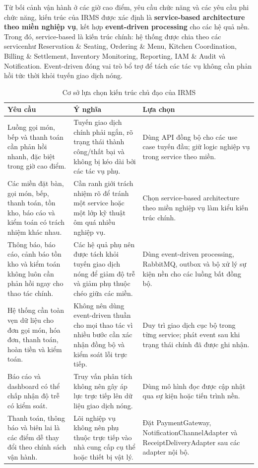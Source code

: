 Từ bối cảnh vận hành ở các giờ cao điểm, yêu cầu chức năng và các yêu cầu phi chức năng, kiến trúc của IRMS được xác định là \textbf{service-based architecture theo miền nghiệp vụ}, kết hợp \textbf{event-driven processing} cho các hệ quả nền. Trong đó, service-based là kiến trúc chính: hệ thống được chia theo các servicenhư \textsf{Reservation \& Seating}, \textsf{Ordering \& Menu}, \textsf{Kitchen Coordination}, \textsf{Billing \& Settlement}, \textsf{Inventory Monitoring}, \textsf{Reporting}, \textsf{IAM \& Audit} và \textsf{Notification}. Event-driven đóng vai trò bổ trợ để tách các tác vụ không cần phản hồi tức thời khỏi tuyến giao dịch nóng.


\begin{table}[H]
\centering
\caption{Cơ sở lựa chọn kiến trúc chủ đạo của IRMS}
\label{tab:system-architecture-choice-rationale}
\small
\renewcommand{\arraystretch}{1.15}
\begin{tabularx}{\textwidth}{>{\raggedright\arraybackslash}p{3.2cm} >{\raggedright\arraybackslash}p{5.1cm} X}
\toprule
\textbf{Yêu cầu} & \textbf{Ý nghĩa} & \textbf{Lựa chọn} \\
\midrule
Luồng gọi món, bếp và thanh toán cần phản hồi nhanh, đặc biệt trong giờ cao điểm. & Tuyến giao dịch chính phải ngắn, rõ trạng thái thành công/thất bại và không bị kéo dài bởi các tác vụ phụ. & Dùng API đồng bộ cho các use case tuyến đầu; giữ logic nghiệp vụ trong service theo miền. \\
\addlinespace
Các miền đặt bàn, gọi món, bếp, thanh toán, tồn kho, báo cáo và kiểm toán có trách nhiệm khác nhau. & Cần ranh giới trách nhiệm rõ để tránh một service hoặc một lớp kỹ thuật ôm quá nhiều nghiệp vụ. & Chọn service-based architecture theo miền nghiệp vụ làm kiểu kiến trúc chính. \\
\addlinespace
Thông báo, báo cáo, cảnh báo tồn kho và kiểm toán không luôn cần phản hồi ngay cho thao tác chính. & Các hệ quả phụ nên được tách khỏi tuyến giao dịch nóng để giảm độ trễ và giảm phụ thuộc chéo giữa các miền. & Dùng event-driven processing, 	\textsf{RabbitMQ}, outbox và bộ xử lý sự kiện nền cho các luồng bất đồng bộ. \\
\addlinespace
Hệ thống cần toàn vẹn dữ liệu cho đơn gọi món, hóa đơn, thanh toán, hoàn tiền và kiểm toán. & Không nên dùng event-driven thuần cho mọi thao tác vì nhiều bước cần xác nhận đồng bộ và kiểm soát lỗi trực tiếp. & Duy trì giao dịch cục bộ trong từng service; phát event sau khi trạng thái chính đã được ghi nhận. \\
\addlinespace
Báo cáo và dashboard có thể chấp nhận độ trễ có kiểm soát. & Truy vấn phân tích không nên gây áp lực trực tiếp lên dữ liệu giao dịch nóng. & Dùng mô hình đọc được cập nhật qua sự kiện hoặc tiến trình nền. \\
\addlinespace
Thanh toán, thông báo và biên lai là các điểm dễ thay đổi theo chính sách vận hành. & Lõi nghiệp vụ không nên phụ thuộc trực tiếp vào nhà cung cấp cụ thể hoặc thiết bị vật lý. & Đặt \textsf{PaymentGateway}, \textsf{NotificationChannelAdapter} và \textsf{ReceiptDeliveryAdapter} sau các adapter nội bộ. \\
\bottomrule
\end{tabularx}
\normalsize
\end{table}


